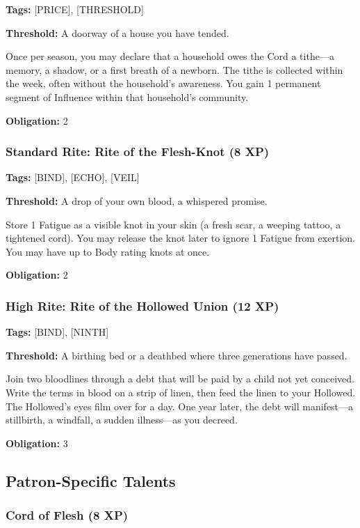 \textbf{Tags:} [PRICE], [THRESHOLD]

\textbf{Threshold:} A doorway of a house you have tended.

Once per season, you may declare that a household owes the Cord a tithe—a memory, a shadow, or a first breath of a newborn. The tithe is collected within the week, often without the household's awareness. You gain 1 permanent segment of Influence within that household's community.

\textbf{Obligation:} 2

\subsubsection{Standard Rite: Rite of the Flesh-Knot (8 XP)}

\textbf{Tags:} [BIND], [ECHO], [VEIL]

\textbf{Threshold:} A drop of your own blood, a whispered promise.

Store 1 Fatigue as a visible knot in your skin (a fresh scar, a weeping tattoo, a tightened cord). You may release the knot later to ignore 1 Fatigue from exertion. You may have up to Body rating knots at once.

\textbf{Obligation:} 2

\subsubsection{High Rite: Rite of the Hollowed Union (12 XP)}

\textbf{Tags:} [BIND], [NINTH]

\textbf{Threshold:} A birthing bed or a deathbed where three generations have passed.

Join two bloodlines through a debt that will be paid by a child not yet conceived. Write the terms in blood on a strip of linen, then feed the linen to your Hollowed. The Hollowed's eyes film over for a day. One year later, the debt will manifest—a stillbirth, a windfall, a sudden illness—as you decreed.

\textbf{Obligation:} 3

\subsection{Patron-Specific Talents}

\subsubsection{Cord of Flesh (8 XP)}

